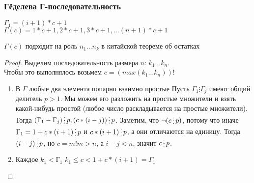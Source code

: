 \subsubsection{Гёделева Г-последовательность}
\label{sec-11-3-2}
$\Gamma_1 = (i + 1) * c + 1$\\
$\Gamma(c) = 1 * c + 1, 2 * c + 1, 3 * c + 1, \ldots (n + 1) * c + 1$
\begin{theorem}
$\Gamma(c)$ подходит на роль $n_1 \ldots n_k$ в китайской теореме об остатках
\end{theorem}
\begin{proof}
Выделим последовательность размера $n$: $k_1 \ldots k_n$.\\
Чтобы это выполнялось возьмем $c = (max(k_1\ldots{}k_n))!$
\begin{enumerate}
\item В $\Gamma$ любые два элемента попарно взаимно простые
\label{sec-11-3-2-1}
Пусть $\Gamma_1 \vdots \Gamma_j$ имеют общий делитель $p > 1$. Мы можем его разложить на простые множители и взять какой-нибудь простой (любое число раскладывается на простые множители).\\
Тогда $(\Gamma_1 - \Gamma_j) \divby p, (c * (i - j)) \divby p$. Заметим, что $\lnot (c \divby p)$, потому что иначе $\Gamma_1 = 1 + c * (i + 1) \divby p$ и $c * (i + 1) \divby p$, а они отличаются на единицу. Тогда $(i - j) \divby p$, но $c = m! m > n$, а $i - j < n$, значит $c \divby p$.
\item Каждое $k_1 < Г_1$
\label{sec-11-3-2-2}
$k_1 \leq c < 1 + c * (i + 1) = \Gamma_1$
\end{enumerate}
\end{proof}
